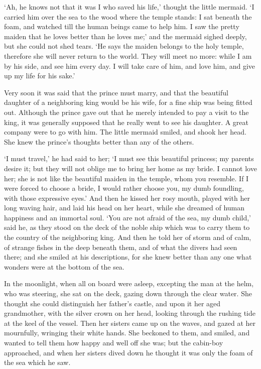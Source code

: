`Ah, he knows not that it was I who saved his life,' thought the
little mermaid. 
`I carried him over the sea to the wood where the
temple stands: I sat beneath the foam, and watched till the human
beings came to help him. 
I saw the pretty maiden that he loves
better than he loves me;' and the mermaid sighed deeply, but she could
not shed tears. 
`He says the maiden belongs to the holy temple,
therefore she will never return to the world. 
They will meet no
more: while I am by his side, and see him every day. 
I will take
care of him, and love him, and give up my life for his sake.'

Very soon it was said that the prince must marry, and that the
beautiful daughter of a neighboring king would be his wife, for a fine
ship was being fitted out. 
Although the prince gave out that he merely
intended to pay a visit to the king, it was generally supposed that he
really went to see his daughter. 
A great company were to go with
him. 
The little mermaid smiled, and shook her head. 
She knew the
prince's thoughts better than any of the others.

`I must travel,' he had said to her; `I must see this beautiful
princess; my parents desire it; but they will not oblige me to bring
her home as my bride. 
I cannot love her; she is not like the beautiful
maiden in the temple, whom you resemble. 
If I were forced to choose
a bride, I would rather choose you, my dumb foundling, with those
expressive eyes.' And then he kissed her rosy mouth, played with her
long waving hair, and laid his head on her heart, while she dreamed of
human happiness and an immortal soul. 
`You are not afraid of the
sea, my dumb child,' said he, as they stood on the deck of the noble
ship which was to carry them to the country of the neighboring king.
And then he told her of storm and of calm, of strange fishes in the
deep beneath them, and of what the divers had seen there; and she
smiled at his descriptions, for she knew better than any one what
wonders were at the bottom of the sea.

In the moonlight, when all on board were asleep, excepting the man
at the helm, who was steering, she sat on the deck, gazing down
through the clear water. 
She thought she could distinguish her
father's castle, and upon it her aged grandmother, with the silver
crown on her head, looking through the rushing tide at the keel of the
vessel. 
Then her sisters came up on the waves, and gazed at her
mournfully, wringing their white hands. 
She beckoned to them, and
smiled, and wanted to tell them how happy and well off she was; but
the cabin-boy approached, and when her sisters dived down he thought
it was only the foam of the sea which he saw.

